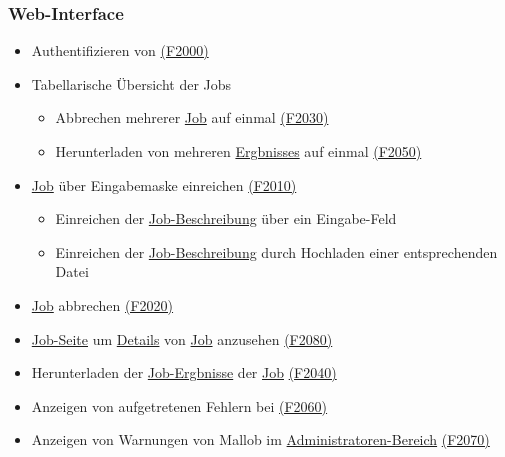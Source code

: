     \subsubsection{Web-Interface}
        \begin{itemize}[noitemsep]
            \item Authentifizieren von  \hyperref[FA:Web-Interface:Anmelden]{(F2000)}
            \item Tabellarische Übersicht  der Jobs
                \begin{itemize}[noitemsep]
                    \item Abbrechen mehrerer \hyperref[B:Jobs]{Job} auf einmal \hyperref[FA:Web-Interface:Abbruch mehrerer Jobs auf einmal]{(F2030)}
                    \item Herunterladen von mehreren \hyperref[B:Job-Ergebnis]{Ergbnisses} auf einmal \hyperref[FA:Web-Interface:herunterladen mehrerer Ergebnisse auf einmal]{(F2050)}
                \end{itemize}
            \item \hyperref[B:Jobs]{Job} über Eingabemaske einreichen \hyperref[FA:Web-Interface:Job einreichen]{(F2010)}
                \begin{itemize}[noitemsep]
                    \item Einreichen der \hyperref[B:Job-Beschreibung]{Job-Beschreibung} über ein Eingabe-Feld 
                    \item Einreichen der \hyperref[B:Job-Beschreibung]{Job-Beschreibung} durch Hochladen einer entsprechenden Datei
                \end{itemize}
            \item \hyperref[B:Jobs]{Job} abbrechen \hyperref[FA:Web-Interface:Abbruch eines einzelnen Jobs]{(F2020)}
            \item \hyperref[pages:job-page]{Job-Seite} um \hyperref[B:Job-Details]{Details} von \hyperref[B:Jobs]{Job} anzusehen \hyperref[FA:Web-Interface:Einsehen von Job-Informationen]{(F2080)}
            \item Herunterladen der \hyperref[B:Job-Ergebnis]{Job-Ergbnisse} der \hyperref[B:Jobs]{Job} \hyperref[FA:Web-Interface:Herunterladen eines einzelnen Ergebnisses]{(F2040)}
            \item Anzeigen von aufgetretenen Fehlern bei  \hyperref[FA:Web-Interface:Anzeigen von Fehlern]{(F2060)}
            \item Anzeigen von Warnungen von Mallob im \hyperref[pages:admin]{Administratoren-Bereich} \hyperref[FA:Web-Interface:Anzeigen von Warnungen und Fehlermeldungen]{(F2070)} 
            
                      
        \end{itemize}
